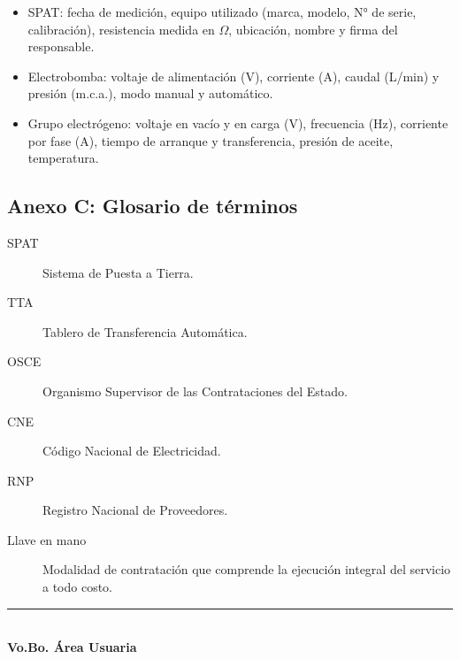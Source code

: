\documentclass[12pt,a4paper]{article}
\begin{document}
\begin{itemize}
  \item SPAT: fecha de medición, equipo utilizado (marca, modelo, N° de serie, calibración), resistencia medida en $\Omega$, ubicación, nombre y firma del responsable.
  \item Electrobomba: voltaje de alimentación (V), corriente (A), caudal (L/min) y presión (m.c.a.), modo manual y automático.
  \item Grupo electrógeno: voltaje en vacío y en carga (V), frecuencia (Hz), corriente por fase (A), tiempo de arranque y transferencia, presión de aceite, temperatura.
\end{itemize}

\subsection{Anexo C: Glosario de términos}

\begin{description}
  \item[SPAT] Sistema de Puesta a Tierra.
  \item[TTA] Tablero de Transferencia Automática.
  \item[OSCE] Organismo Supervisor de las Contrataciones del Estado.
  \item[CNE] Código Nacional de Electricidad.
  \item[RNP] Registro Nacional de Proveedores.
  \item[Llave en mano] Modalidad de contratación que comprende la ejecución integral del servicio a todo costo.
\end{description}

\vspace{1cm}

\begin{center}
\rule{8cm}{0.4pt} \\
\textbf{Vo.Bo. Área Usuaria} \\
\end{center}
\end{document}
